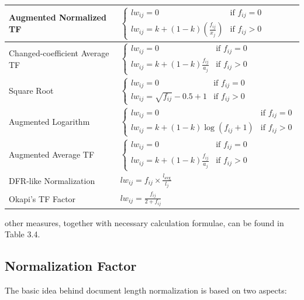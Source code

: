 \begin{table}[H]
\begin{tabular}{l|l}
\hline
Augmented Normalized TF &
$\begin{cases}
l w_{ij} = 0 & \text{if } f_{ij} = 0 \\
l w_{ij} = k + (1 - k) \left( \frac{f_{ij}}{x_j} \right) & \text{if } f_{ij} > 0
\end{cases}$ \\

\hline
Changed-coefficient Average TF &
$\begin{cases}
l w_{ij} = 0 & \text{if } f_{ij} = 0 \\
l w_{ij} = k + (1 - k) \frac{f_{ij}}{a_j} & \text{if } f_{ij} > 0
\end{cases}$ \\

\hline
Square Root &
$\begin{cases}
l w_{ij} = 0 & \text{if } f_{ij} = 0 \\
l w_{ij} = \sqrt{f_{ij}} - 0.5 + 1 & \text{if } f_{ij} > 0
\end{cases}$ \\

\hline
Augmented Logarithm &
$\begin{cases}
l w_{ij} = 0 & \text{if } f_{ij} = 0 \\
l w_{ij} = k + (1 - k) \log(f_{ij} + 1) & \text{if } f_{ij} > 0
\end{cases}$ \\

\hline
Augmented Average TF &
$\begin{cases}
l w_{ij} = 0 & \text{if } f_{ij} = 0 \\
l w_{ij} = k + (1 - k) \frac{f_{ij}}{a_j} & \text{if } f_{ij} > 0
\end{cases}$ \\

\hline
DFR-like Normalization &
$l w_{ij} = f_{ij} \times \frac{l_{\mathrm{avg}}}{l_j}$ \\

\hline
Okapi's TF Factor &
$l w_{ij} = \frac{f_{ij}}{2 + f_{ij}}$ \\
\hline
\end{tabular}
\end{table}

other measures, together with necessary calculation formulae, can be found in
Table 3.4.

\subsection{Normalization Factor}
The basic idea behind document length normalization is based on two aspects:

